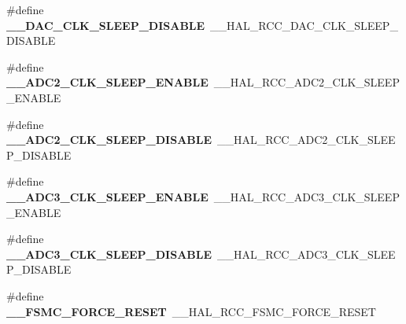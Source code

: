 \begin{DoxyCompactItemize}
\item 
\hypertarget{group___h_a_l___r_c_c___aliased_ga9142ad3f5c2df9a2613f6cb16ba7fa67}{\#define {\bfseries \-\_\-\-\_\-\-D\-A\-C\-\_\-\-C\-L\-K\-\_\-\-S\-L\-E\-E\-P\-\_\-\-D\-I\-S\-A\-B\-L\-E}~\-\_\-\-\_\-\-H\-A\-L\-\_\-\-R\-C\-C\-\_\-\-D\-A\-C\-\_\-\-C\-L\-K\-\_\-\-S\-L\-E\-E\-P\-\_\-\-D\-I\-S\-A\-B\-L\-E}\label{group___h_a_l___r_c_c___aliased_ga9142ad3f5c2df9a2613f6cb16ba7fa67}

\item 
\hypertarget{group___h_a_l___r_c_c___aliased_gafe24a48e39c495dbd65a3b0b0703d7a5}{\#define {\bfseries \-\_\-\-\_\-\-A\-D\-C2\-\_\-\-C\-L\-K\-\_\-\-S\-L\-E\-E\-P\-\_\-\-E\-N\-A\-B\-L\-E}~\-\_\-\-\_\-\-H\-A\-L\-\_\-\-R\-C\-C\-\_\-\-A\-D\-C2\-\_\-\-C\-L\-K\-\_\-\-S\-L\-E\-E\-P\-\_\-\-E\-N\-A\-B\-L\-E}\label{group___h_a_l___r_c_c___aliased_gafe24a48e39c495dbd65a3b0b0703d7a5}

\item 
\hypertarget{group___h_a_l___r_c_c___aliased_gaccf07903e462de87910e343822775936}{\#define {\bfseries \-\_\-\-\_\-\-A\-D\-C2\-\_\-\-C\-L\-K\-\_\-\-S\-L\-E\-E\-P\-\_\-\-D\-I\-S\-A\-B\-L\-E}~\-\_\-\-\_\-\-H\-A\-L\-\_\-\-R\-C\-C\-\_\-\-A\-D\-C2\-\_\-\-C\-L\-K\-\_\-\-S\-L\-E\-E\-P\-\_\-\-D\-I\-S\-A\-B\-L\-E}\label{group___h_a_l___r_c_c___aliased_gaccf07903e462de87910e343822775936}

\item 
\hypertarget{group___h_a_l___r_c_c___aliased_ga70dc337170018b5b412db6b7c0859737}{\#define {\bfseries \-\_\-\-\_\-\-A\-D\-C3\-\_\-\-C\-L\-K\-\_\-\-S\-L\-E\-E\-P\-\_\-\-E\-N\-A\-B\-L\-E}~\-\_\-\-\_\-\-H\-A\-L\-\_\-\-R\-C\-C\-\_\-\-A\-D\-C3\-\_\-\-C\-L\-K\-\_\-\-S\-L\-E\-E\-P\-\_\-\-E\-N\-A\-B\-L\-E}\label{group___h_a_l___r_c_c___aliased_ga70dc337170018b5b412db6b7c0859737}

\item 
\hypertarget{group___h_a_l___r_c_c___aliased_gaa9fc68ed09451ca236c66d73424084b3}{\#define {\bfseries \-\_\-\-\_\-\-A\-D\-C3\-\_\-\-C\-L\-K\-\_\-\-S\-L\-E\-E\-P\-\_\-\-D\-I\-S\-A\-B\-L\-E}~\-\_\-\-\_\-\-H\-A\-L\-\_\-\-R\-C\-C\-\_\-\-A\-D\-C3\-\_\-\-C\-L\-K\-\_\-\-S\-L\-E\-E\-P\-\_\-\-D\-I\-S\-A\-B\-L\-E}\label{group___h_a_l___r_c_c___aliased_gaa9fc68ed09451ca236c66d73424084b3}

\item 
\hypertarget{group___h_a_l___r_c_c___aliased_gad461d9ba55841153c9feb590b52be1f0}{\#define {\bfseries \-\_\-\-\_\-\-F\-S\-M\-C\-\_\-\-F\-O\-R\-C\-E\-\_\-\-R\-E\-S\-E\-T}~\-\_\-\-\_\-\-H\-A\-L\-\_\-\-R\-C\-C\-\_\-\-F\-S\-M\-C\-\_\-\-F\-O\-R\-C\-E\-\_\-\-R\-E\-S\-E\-T}\label{group___h_a_l___r_c_c___aliased_gad461d9ba55841153c9feb590b52be1f0}


\end{DoxyCompactItemize}
